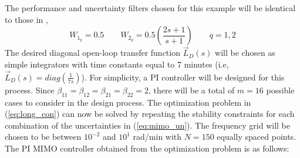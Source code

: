 \documentclass[default]{svmult}
\begin{document}
The performance and uncertainty filters chosen for this example will be identical to those in \cite{GKL10b},
\begin{equation}
W_{1_{q}}=0.5 \qquad W_{2_{q}}=0.5\left(\frac{2s+1}{s+1}\right) \qquad  q=1,2
\end{equation}
The desired diagonal open-loop transfer function $\vec{L}_D(s)$ will be chosen as simple integrators with time constants equal to 7 minutes (i.e, $\vec{L}_D(s)=diag\left(\frac{1}{7s}\right)$). For simplicity, a PI controller will be designed for this process. Since $\beta_{11}=\beta_{12}=\beta_{21}=\beta_{22}=2$, there will be a total of $m=16$ possible cases to consider in the design process. The optimization problem in (\ref{eq:long_con}) can now be solved by repeating the stability constraints for each combination of the uncertainties in (\ref{eq:mimo_un}). The frequency grid will be chosen to be between $10^{-2}$ and $10^{1}$ rad/min with $N=150$ equally spaced points. The PI MIMO controller obtained from the optimization problem is as follows:
\end{document}
